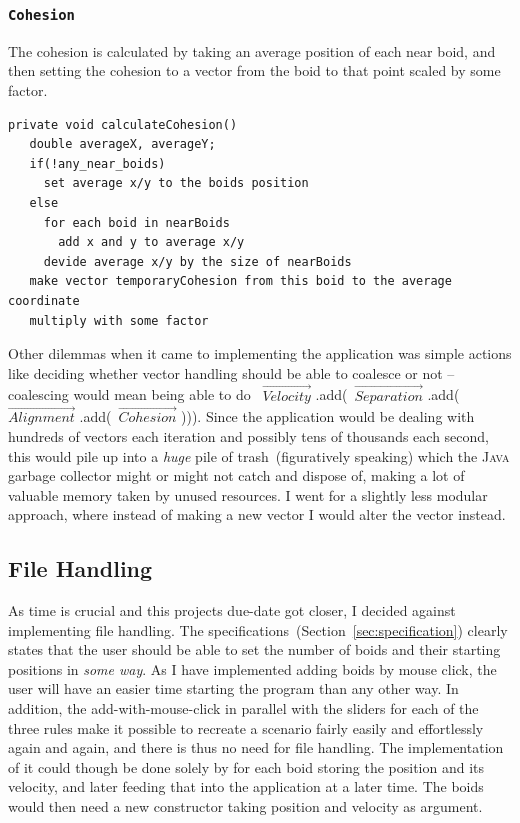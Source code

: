 \documentclass[a4paper,twoside, 10pt]{report}
\newcommand{\code}[1]{\texttt{#1}}
\begin{document}
\newpage
\subsubsection{\code{Cohesion}}
\label{subsubsec:cohesionImplement}
The cohesion is calculated by taking an average position of each near boid, and then setting the cohesion to a vector from the boid to that point scaled by some factor.

\begin{verbatim}
private void calculateCohesion()
   double averageX, averageY;
   if(!any_near_boids)
     set average x/y to the boids position
   else
     for each boid in nearBoids
       add x and y to average x/y
     devide average x/y by the size of nearBoids
   make vector temporaryCohesion from this boid to the average coordinate
   multiply with some factor
\end{verbatim}

Other dilemmas when it came to implementing the application was simple actions like deciding whether vector handling should be able to coalesce or not -- coalescing would mean being able to do \newline~$\vec{Velocity}^{\,~}$.add(~$\vec{Separation}^{\,~}$.add(~$\vec{Alignment}^{\,~}$.add(~$\vec{Cohesion}^{\,~}$))). Since the application would be dealing with hundreds of vectors each iteration and possibly tens of thousands each second, this would pile up into a \textit{huge} pile of trash~(figuratively speaking) which the \textsc{Java} garbage collector might or might not catch and dispose of, making a lot of valuable memory taken by unused resources. I went for a slightly less modular approach, where instead of making a new vector I would alter the vector instead.

\subsection{File Handling}
\label{subsec:fileHandling}
As time is crucial and this projects due-date got closer, I decided against implementing file handling. The specifications~(Section~\ref{sec:specification}) clearly states that the user should be able to set the number of boids and their starting positions in \textit{some way}. As I have implemented adding boids by mouse click, the user will have an easier time starting the program than any other way. In addition, the add-with-mouse-click in parallel with the sliders for each of the three rules make it possible to recreate a scenario fairly easily and effortlessly again and again, and there is thus no need for file handling. The implementation of it could though be done solely by for each boid storing the position and its velocity, and later feeding that into the application at a later time. The boids would then need a new constructor taking position and velocity as argument.
\end{document}
